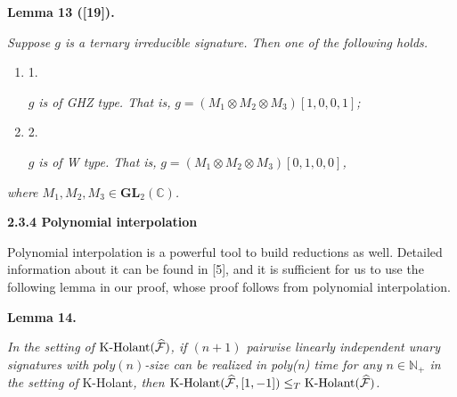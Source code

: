 

\par\medskip\noindent\textbf{
\textbf{Lemma 13}\textbf{ }([19])\textbf{.}
}\par



\emph{Suppose $g$ is a ternary irreducible signature. Then one of the following holds.}\par


\begin{enumerate}


\item[] 
1. 


$g$\emph{ is of GHZ type. That is, }$g=(M_{1}\otimes M_{2}\otimes M_{3})[1,0,0,1]$\emph{;}\par





\item[] 
2. 


$g$\emph{ is of W type. That is, }$g=(M_{1}\otimes M_{2}\otimes M_{3})[0,1,0,0]$\emph{,}\par





\end{enumerate}


\emph{where $M_{1},M_{2},M_{3}\in\mathbf{GL}_{2}(\mathbb{C})$.}\par







\par\medskip\noindent\textbf{
2.3.4 Polynomial interpolation}\par




Polynomial interpolation is a powerful tool to build reductions as well. Detailed information about it can be found in [5], and it is sufficient for us to use the following lemma in our proof, whose proof follows from polynomial interpolation.\par





\par\medskip\noindent\textbf{
\textbf{Lemma 14}\textbf{.}
}\par



\emph{In the setting of $\textup{{K-Holant}}(\widehat{\mathcal{F}})$, if $(n+1)$ pairwise linearly independent unary signatures with $poly(n)$-size can be realized in poly(n) time for any $n\in\mathbb{N}_{+}$ in the setting of }K-Holant\emph{, then $\textup{{K-Holant}}(\widehat{\mathcal{F}},[1,-1])\leq_{T}\textup{{K-Holant}}(\widehat{\mathcal{F}})$.}\par



